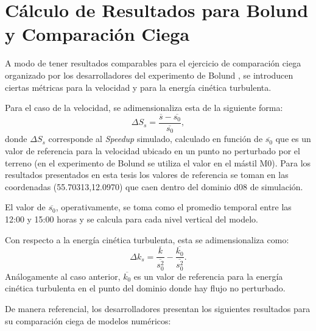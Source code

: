 \graphicspath{{./Imagenes/an1/}}
\chapter{Cálculo de Resultados para Bolund y Comparación Ciega}
\label{ch:apA}
A modo de tener resultados comparables para el ejercicio de comparación ciega organizado por los desarrolladores del experimento de Bolund \citep{Bechmann2011}, se introducen ciertas métricas para la velocidad y para la energía cinética turbulenta.

Para el caso de la velocidad, se adimensionaliza esta de la siguiente forma:
\begin{equation}
\Delta S_s = \frac{\overline{s} - \overline{s_0}}{\overline{s_0}},
\end{equation}
donde $\Delta S_s$ corresponde al \emph{Speedup} simulado, calculado en función de $\overline{s_0}$ que es un valor de referencia para la velocidad ubicado en un punto no perturbado por el terreno (en el experimento de Bolund se utiliza el valor en el mástil M0). Para los resultados presentados en esta tesis los valores de referencia se toman en las coordenadas (55.70313,12.0970) que caen dentro del dominio d08 de simulación.

El valor de $\overline{s_0}$, operativamente, se toma como el promedio temporal entre las 12:00 y 15:00 horas y se calcula para cada nivel vertical del modelo.

Con respecto a la energía cinética turbulenta, esta se adimensionaliza como:
\begin{equation*}
\Delta k_s = \frac{\overline{k}}{\overline{s_0^2}} - \frac{\overline{k_0}}{\overline{s_0^2}}.
\end{equation*}
Análogamente al caso anterior, $\overline{k_0}$ es un valor de referencia para la energía cinética turbulenta en el punto del dominio donde hay flujo no perturbado.

De manera referencial, los desarrolladores presentan los siguientes resultados para su comparación ciega de modelos numéricos:
\newpage


